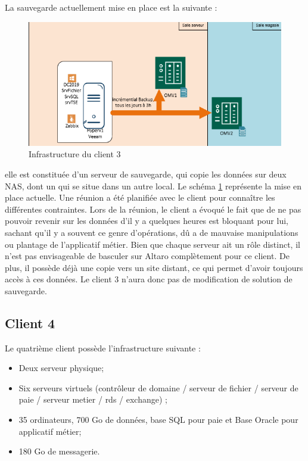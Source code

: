 \documentclass[pfe]{tnreport} %
\begin{document}
La sauvegarde actuellement mise en place est la suivante : 
\begin{figure}[ht]
 \centering
 \includegraphics[width=15cm]{figures/client3.png}
 \caption{Infrastructure du client 3}
 \label{fig:client3}
\end{figure}
elle est constituée d'un serveur de sauvegarde, qui copie les données sur deux NAS, dont un qui se situe dans un autre local. \newline
Le schéma \ref{fig:client3} représente la mise en place actuelle. \newline
Une réunion a été planifiée avec le client pour connaître les différentes contraintes. 
Lors de la réunion, le client a évoqué le fait que de ne pas pouvoir revenir sur les données d'il y a quelques heures est bloquant pour lui, sachant qu'il y a souvent ce genre d'opérations, dû a de mauvaise manipulations ou plantage de l'applicatif métier. \newline
Bien que chaque serveur ait un rôle distinct, il n'est pas envisageable de basculer sur Altaro complètement pour ce client. \newline
De plus, il possède déjà une copie vers un site distant, ce qui permet d'avoir toujours accès à ces données. \newline
Le client 3 n'aura donc pas de modification de solution de sauvegarde.

\subsection{Client 4}

Le quatrième client possède l'infrastructure suivante : \newline
\begin{itemize}
 \item Deux serveur physique;
 \item Six serveurs virtuels (contrôleur de domaine / serveur de fichier / serveur de paie / serveur metier / rds / exchange) ;
\item 35 ordinateurs, 700 Go de données, base SQL pour paie et Base Oracle pour applicatif métier;
\item 180 Go de messagerie. \newline
\end{itemize}
\end{document}
